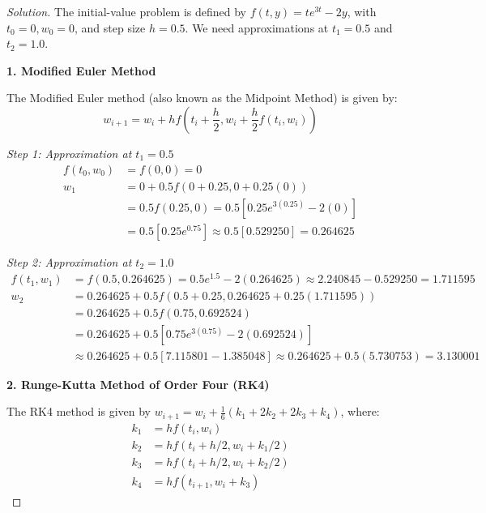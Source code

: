 \documentclass[11pt, a4paper]{article}
\newif\ifsolutionnewpage
\newenvironment{solution}
  {\begin{proof}[Solution]}
  {\end{proof}\ifsolutionnewpage\newpage\fi}
\begin{document}
        \begin{solution}
        The initial-value problem is defined by $f(t, y) = te^{3t} - 2y$, with $t_0 = 0, w_0 = 0$, and step size $h = 0.5$. We need approximations at $t_1 = 0.5$ and $t_2 = 1.0$.
        
        \vspace{0.3cm}
        \textbf{1. Modified Euler Method} 
        
        The Modified Euler method (also known as the Midpoint Method) is given by:
        \begin{equation*}
        w_{i+1} = w_i + h f\left(t_i + \frac{h}{2}, w_i + \frac{h}{2}f(t_i, w_i)\right)
        \end{equation*}
        
        \textit{Step 1: Approximation at $t_1 = 0.5$}
        \begin{align*}
        f(t_0, w_0) &= f(0, 0) = 0 \\
        w_1 &= 0 + 0.5 f(0 + 0.25, 0 + 0.25(0)) \\
        &= 0.5 f(0.25, 0) = 0.5 \left[ 0.25e^{3(0.25)} - 2(0) \right] \\
        &= 0.5 [0.25e^{0.75}] \approx 0.5 [0.529250] = \mathbf{0.264625}
        \end{align*}
        
        \textit{Step 2: Approximation at $t_2 = 1.0$}
        \begin{align*}
        f(t_1, w_1) &= f(0.5, 0.264625) = 0.5e^{1.5} - 2(0.264625) \approx 2.240845 - 0.529250 = 1.711595 \\
        w_2 &= 0.264625 + 0.5 f(0.5 + 0.25, 0.264625 + 0.25(1.711595)) \\
        &= 0.264625 + 0.5 f(0.75, 0.692524) \\
        &= 0.264625 + 0.5 \left[ 0.75e^{3(0.75)} - 2(0.692524) \right] \\
        &\approx 0.264625 + 0.5 \left[ 7.115801 - 1.385048 \right] \approx 0.264625 + 0.5(5.730753) = \mathbf{3.130001}
        \end{align*}
        
        \vspace{0.3cm}
        \textbf{2. Runge-Kutta Method of Order Four (RK4)}
        
        The RK4 method is given by $w_{i+1} = w_i + \frac{1}{6}(k_1 + 2k_2 + 2k_3 + k_4)$, where:
        \begin{align*}
        k_1 &= h f(t_i, w_i) \\
        k_2 &= h f(t_i + h/2, w_i + k_1/2) \\
        k_3 &= h f(t_i + h/2, w_i + k_2/2) \\
        k_4 &= h f(t_{i+1}, w_i + k_3)
        \end{align*}
        

\end{solution}
\end{document}
